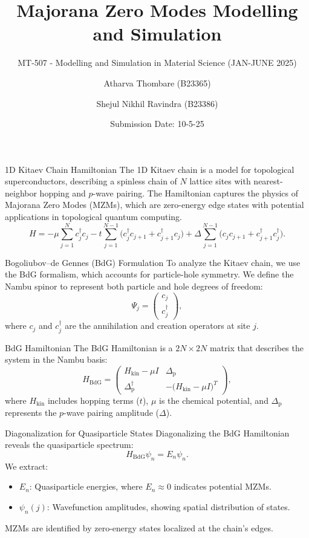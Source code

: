 \documentclass[aspectratio=169]{beamer}
\title{Majorana Zero Modes Modelling and Simulation}
\subtitle{MT-507 - Modelling and Simulation in Material Science (JAN-JUNE 2025)}
\author{Atharva Thombare (B23365) \and Shejul Nikhil Ravindra (B23386)}
\institute{Indian Institute of Technology, Mandi \\ School of Mechanical And Materials Engineering \\ Submitted to: Dr. Dube Dheeraj Prakashchand Sir}
\date{Submission Date: 10-5-25}
\begin{document}
\maketitle

\begin{frame}{1D Kitaev Chain Hamiltonian}
The 1D Kitaev chain is a model for topological superconductors, describing a spinless chain of $N$ lattice sites with nearest-neighbor hopping and $p$-wave pairing. The Hamiltonian captures the physics of Majorana Zero Modes (MZMs), which are zero-energy edge states with potential applications in topological quantum computing.
\[ H = -\mu \sum_{j=1}^N c_j^\dagger c_j - t \sum_{j=1}^{N-1} \bigl(c_j^\dagger c_{j+1} + c_{j+1}^\dagger c_j\bigr) + \Delta \sum_{j=1}^{N-1} \bigl(c_j c_{j+1} + c_{j+1}^\dagger c_j^\dagger\bigr). \]
\end{frame}

\begin{frame}{Bogoliubov--de Gennes (BdG) Formulation}
To analyze the Kitaev chain, we use the BdG formalism, which accounts for particle-hole symmetry. We define the Nambu spinor to represent both particle and hole degrees of freedom:
\[ \Psi_j = \begin{pmatrix} c_j \\ c_j^\dagger \end{pmatrix}, \]
where $c_j$ and $c_j^\dagger$ are the annihilation and creation operators at site $j$.
\end{frame}

\begin{frame}{BdG Hamiltonian}
The BdG Hamiltonian is a $2N \times 2N$ matrix that describes the system in the Nambu basis:
\[ H_{\mathrm{BdG}} = \begin{pmatrix} H_{\mathrm{kin}} - \mu I & \Delta_{\mathrm{p}} \\ \Delta_{\mathrm{p}}^\dagger & -\bigl(H_{\mathrm{kin}} - \mu I\bigr)^T \end{pmatrix}, \]
where $H_{\mathrm{kin}}$ includes hopping terms ($t$), $\mu$ is the chemical potential, and $\Delta_{\mathrm{p}}$ represents the $p$-wave pairing amplitude ($\Delta$).
\end{frame}

\begin{frame}{Diagonalization for Quasiparticle States}
Diagonalizing the BdG Hamiltonian reveals the quasiparticle spectrum:
\[ H_{\mathrm{BdG}} \psi_n = E_n \psi_n. \]
We extract:
\begin{itemize}
\item $E_n$: Quasiparticle energies, where $E_n \approx 0$ indicates potential MZMs.
\item $\psi_n(j)$: Wavefunction amplitudes, showing spatial distribution of states.
\end{itemize}
MZMs are identified by zero-energy states localized at the chain's edges.
\end{frame}
\end{document}
